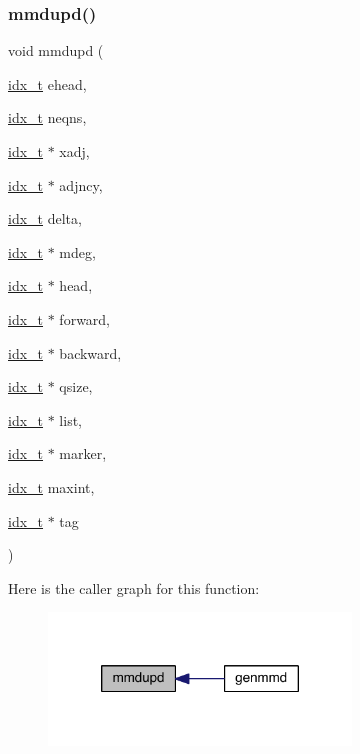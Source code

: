 \subsubsection{\texorpdfstring{mmdupd()}{mmdupd()}}
{\footnotesize\ttfamily void mmdupd (\begin{DoxyParamCaption}\item[{\hyperlink{a00876_aaa5262be3e700770163401acb0150f52}{idx\+\_\+t}}]{ehead,  }\item[{\hyperlink{a00876_aaa5262be3e700770163401acb0150f52}{idx\+\_\+t}}]{neqns,  }\item[{\hyperlink{a00876_aaa5262be3e700770163401acb0150f52}{idx\+\_\+t} $\ast$}]{xadj,  }\item[{\hyperlink{a00876_aaa5262be3e700770163401acb0150f52}{idx\+\_\+t} $\ast$}]{adjncy,  }\item[{\hyperlink{a00876_aaa5262be3e700770163401acb0150f52}{idx\+\_\+t}}]{delta,  }\item[{\hyperlink{a00876_aaa5262be3e700770163401acb0150f52}{idx\+\_\+t} $\ast$}]{mdeg,  }\item[{\hyperlink{a00876_aaa5262be3e700770163401acb0150f52}{idx\+\_\+t} $\ast$}]{head,  }\item[{\hyperlink{a00876_aaa5262be3e700770163401acb0150f52}{idx\+\_\+t} $\ast$}]{forward,  }\item[{\hyperlink{a00876_aaa5262be3e700770163401acb0150f52}{idx\+\_\+t} $\ast$}]{backward,  }\item[{\hyperlink{a00876_aaa5262be3e700770163401acb0150f52}{idx\+\_\+t} $\ast$}]{qsize,  }\item[{\hyperlink{a00876_aaa5262be3e700770163401acb0150f52}{idx\+\_\+t} $\ast$}]{list,  }\item[{\hyperlink{a00876_aaa5262be3e700770163401acb0150f52}{idx\+\_\+t} $\ast$}]{marker,  }\item[{\hyperlink{a00876_aaa5262be3e700770163401acb0150f52}{idx\+\_\+t}}]{maxint,  }\item[{\hyperlink{a00876_aaa5262be3e700770163401acb0150f52}{idx\+\_\+t} $\ast$}]{tag }\end{DoxyParamCaption})}

Here is the caller graph for this function\+:\nopagebreak
\begin{figure}[H]
\begin{center}
\leavevmode
\includegraphics[width=228pt]{a00248_ad2abd99ecd82dcbf67f2ae61600168e5_icgraph}
\end{center}
\end{figure}
